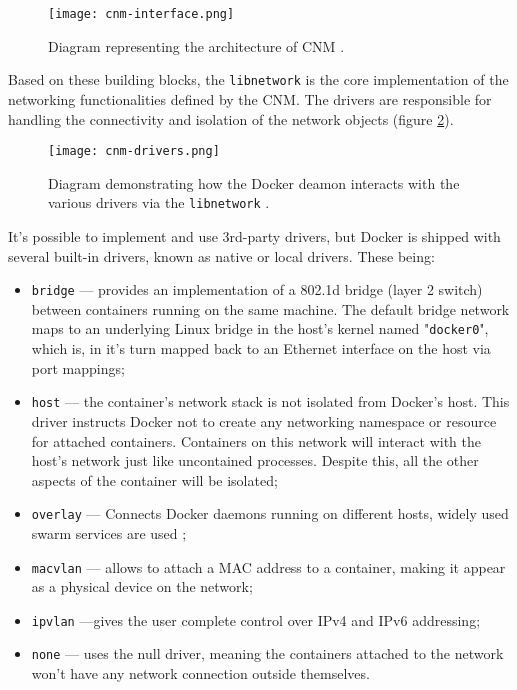 \begin{figure}[!htb]
    \centering
    \texttt{[image: cnm-interface.png]}
    \caption{Diagram representing the architecture of \ac{CNM} \cite{fig-src:cnm}.}
    \label{fig:cnm-interface}
\end{figure}

Based on these building blocks, the \texttt{libnetwork} is the core implementation of the networking functionalities defined by the \ac{CNM}. The drivers are responsible for handling the connectivity and isolation of the network objects (figure \ref{fig:cnm-drivers}).

\begin{figure}[!htb]
    \centering
    \texttt{[image: cnm-drivers.png]}
    \caption{Diagram demonstrating how the Docker deamon interacts with the various drivers via the \texttt{libnetwork} \cite{fig-src:cnm}.}
    \label{fig:cnm-drivers}
\end{figure}

It's possible to implement and use 3rd-party drivers, but Docker is shipped with several built-in drivers, known as native or local drivers\cite{network-drivers}. These being:

\begin{itemize}
    \item \texttt{bridge} --- provides an implementation of a 802.1d bridge (layer 2 switch) between containers running on the same machine. The default bridge network maps to an underlying Linux bridge in the host's kernel named "\texttt{docker0}", which is, in it's turn mapped back to an Ethernet interface on the host via port mappings\cite{network-bridge};
    \item \texttt{host} --- the container's network stack is not isolated from Docker's host. This driver instructs Docker not to create any networking namespace or resource for attached containers. Containers on this network will interact with the host's network just like uncontained processes. Despite this, all the other aspects of the container will be isolated\cite{network-host};
    \item \texttt{overlay} --- Connects Docker daemons running on different hosts, widely used swarm services are used \cite{network-overlay};
    \item \texttt{macvlan} --- allows to attach a \acs{MAC} address to a container, making it appear as a physical device on the network\cite{network-mac};
    \item \texttt{ipvlan} ---gives the user complete control over IPv4 and IPv6 addressing\cite{network-ipvlan};
    \item \texttt{none} --- uses the null driver, meaning the containers attached to the network won't have any network connection outside themselves.
\end{itemize}

